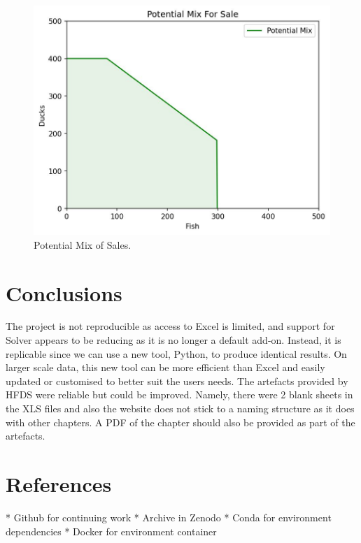 \documentclass[acmtog]{acmart}
\begin{document}
\begin{figure}[h!]
  \includegraphics[width=\linewidth]{potential_mix.jpg}
  \caption{Potential Mix of Sales.}
  \label{fig:boat1}
\end{figure}

\section{Conclusions}
The project is not reproducible as access to Excel is limited, and support for Solver appears to be reducing as it is no longer a default add-on. Instead, it is replicable since we can use a new tool, Python, to produce identical results. On larger scale data, this new tool can be more efficient than Excel and easily updated or customised to better suit the users needs. The artefacts provided by HFDS were  reliable but could be improved. Namely, there were 2 blank sheets in the XLS files and also the website does not stick to a naming structure as it does with other chapters. A PDF of the chapter should also be provided as part of the artefacts.



\section{References}

* Github for continuing work
* Archive in Zenodo
* Conda for environment dependencies
* Docker for environment container
\end{document}
